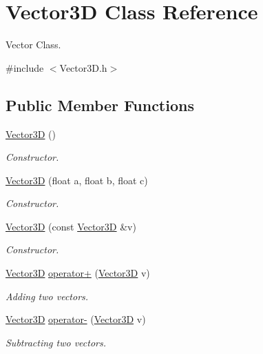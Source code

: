 \hypertarget{classVector3D}{\section{\-Vector3\-D \-Class \-Reference}
\label{classVector3D}
}


\-Vector \-Class.  




{\ttfamily \#include $<$\-Vector3\-D.\-h$>$}

\subsection*{\-Public \-Member \-Functions}
\begin{DoxyCompactItemize}
\item 
\hyperlink{classVector3D_a0b11a8d75da427b27443d8a94d0d296c}{\-Vector3\-D} ()
\begin{DoxyCompactList}\small\item\em \-Constructor. \end{DoxyCompactList}\item 
\hyperlink{classVector3D_a7b0f18fa43c7a90588dedcd814122359}{\-Vector3\-D} (float a, float b, float c)
\begin{DoxyCompactList}\small\item\em \-Constructor. \end{DoxyCompactList}\item 
\hyperlink{classVector3D_a765ee7fc4bf9c338cb96fbd0499257a1}{\-Vector3\-D} (const \hyperlink{classVector3D}{\-Vector3\-D} \&v)
\begin{DoxyCompactList}\small\item\em \-Constructor. \end{DoxyCompactList}\item 
\hyperlink{classVector3D}{\-Vector3\-D} \hyperlink{classVector3D_ac65b7a8ca2d23707c3d85a18e3def662}{operator+} (\hyperlink{classVector3D}{\-Vector3\-D} v)
\begin{DoxyCompactList}\small\item\em \-Adding two vectors. \end{DoxyCompactList}\item 
\hyperlink{classVector3D}{\-Vector3\-D} \hyperlink{classVector3D_aca3997d260df2d76283850a83fc5e05d}{operator-\/} (\hyperlink{classVector3D}{\-Vector3\-D} v)
\begin{DoxyCompactList}\small\item\em \-Subtracting two vectors. \end{DoxyCompactList}\item 

\end{DoxyCompactItemize}

